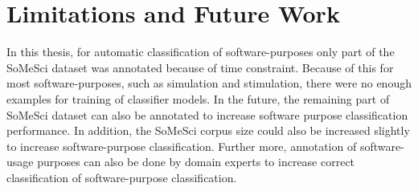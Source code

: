 \section{Limitations and Future Work}
\label{sec:chapter07:futurework}

In this thesis, for automatic classification of software-purposes only part of the \ac{SoMeSci} dataset was annotated because of time constraint. Because of this for most software-purposes, such as simulation and stimulation, there were no enough examples for training of classifier models. In the future, the remaining part of SoMeSci dataset can also be annotated to increase software purpose classification performance. In addition, the SoMeSci corpus size could also be increased slightly to increase software-purpose classification. Further more, annotation of software-usage purposes can also be done by domain experts to increase correct classification of software-purpose classification. 




